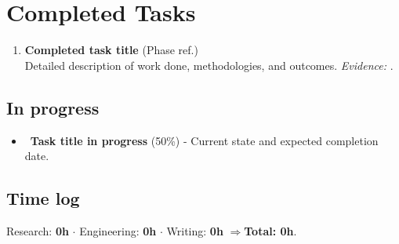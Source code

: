\section{Completed Tasks}
\begin{enumerate}[label=\textbf{C\arabic*.},leftmargin=2.2em]
  \item \textbf{Completed task title} \hfill{\small(Phase ref.)}\\
        Detailed description of work done, methodologies, and outcomes.
        \emph{Evidence:} .
\end{enumerate}

\subsection*{In progress}
\begin{itemize}
  \item \WIP\ \textbf{Task title in progress} (50\%) - Current state and expected completion date.
\end{itemize}

\subsection*{Time log}
\noindent\small
Research: \textbf{0h} $\cdot$ Engineering: \textbf{0h} $\cdot$ Writing: \textbf{0h}
\quad$\Rightarrow$\quad\textbf{Total: 0h}.
\normalsize\par
